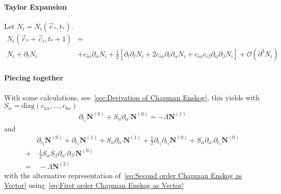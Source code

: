\documentclass[]{article}
\begin{document}
\paragraph{Taylor Expansion}
\label{par:Taylor Expansion}
Let $N_i = N_i(\vec{r}_{*}, t_{*})$.
\begin{equation}
  \begin{aligned}
    \label{eq:taylor}
    N_i(\vec{r}_{*} + \vec{c}_i, t_{*} + 1) &= \\
    N_i + \partial_t N_i &+ c_{i\alpha}\partial_\alpha N_i + \frac{1}{2} [\partial_t\partial_t N_i + 2c_{i\alpha}\partial_t\partial_\alpha N_i + c_{i\alpha}c_{i\beta}\partial_\alpha\partial_\beta N_i] + \mathcal{O}(\partial^3 N_i)
  \end{aligned}
\end{equation}

\paragraph{Piecing together}
\label{par:Piecing together}

With some calculations, see~\ref{sec:Derivation of Chapman Enskog}, this yields with $S_\alpha = \text{diag}(c_{1\alpha}, \dots, c_{b\alpha})$
\begin{equation}
	\begin{aligned}
		\label{eq:First order Chapman Enskog as Vector}
		\partial_{t_1} \boldsymbol{N}^{(0)} + S_{\alpha}\partial_{\alpha'} \boldsymbol{N}^{(0)} = -  \Lambda \boldsymbol{N}^{(1)}
	\end{aligned}
\end{equation}
and
\begin{equation}
	\label{eq:Second order Chapman Enskog as Vector}
	\begin{aligned}
		& \partial_{t_2} \boldsymbol{N}^{(0)} + \partial_{t_1} \boldsymbol{N}^{(1)} + S_\alpha \partial_{\alpha'} \boldsymbol{N}^{(1)} + \frac{1}{2} \partial_{t_1}\partial_{t_1} \boldsymbol{N}^{(0)} +  S_\alpha
		 \partial_{\alpha'}\partial_{t_1} \boldsymbol{N}^{(0)} \\
		+ &\; \frac{1}{2} S_\alpha S_\beta\partial_{\alpha'}\partial_{\beta'} \boldsymbol{N}^{(0)} \\
		= &\; - \Lambda  \boldsymbol{N}^{(2)}
	\end{aligned}
\end{equation}
with the alternative representation of~\eqref{eq:Second order Chapman Enskog as Vector} using~\eqref{eq:First order Chapman Enskog as Vector}
\end{document}
